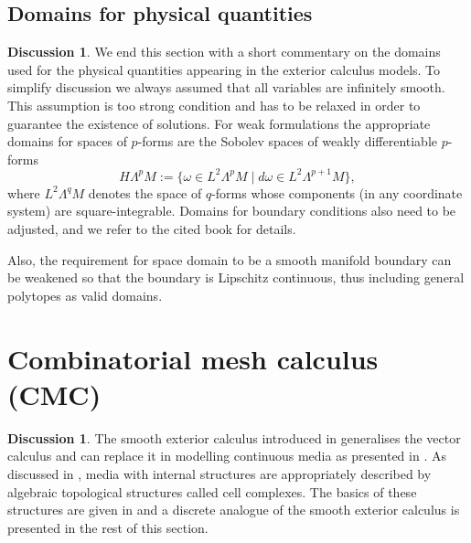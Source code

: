 \documentclass{elsarticle}
\theoremstyle{definition}
\newtheorem{discussion}[theorem]{Discussion}
\newcommand{\set}[2]{\{#1 \mid #2\}}
\begin{document}
\subsection{Domains for physical quantities}
\phantom{T}
\begin{discussion}
  We end this section with a short commentary on the domains used for the physical quantities appearing in the exterior calculus models.
  To simplify discussion we always assumed that all variables are infinitely smooth.
  This assumption is too strong condition and has to be relaxed in order to guarantee the existence of solutions.
  For weak formulations the appropriate domains for spaces of $p$-forms are the Sobolev spaces of weakly differentiable $p$-forms \cite{arnold2018finite}
  \begin{equation}
    H \Lambda^p M := \set{\omega \in L^2 \Lambda^p M}{d \omega \in L^2 \Lambda^{p + 1} M },
  \end{equation}
  where $L^2 \Lambda^q M$ denotes the space of $q$-forms whose components (in any coordinate system) are square-integrable.
  Domains for boundary conditions also need to be adjusted, and we refer to the cited book for details.

  Also, the requirement for space domain to be a smooth manifold boundary can be weakened so that the boundary is Lipschitz continuous, thus including general polytopes as valid domains.
\end{discussion}

\section{Combinatorial mesh calculus (CMC)}
\label{sec:combinatorial}
\begin{discussion}
  The smooth exterior calculus introduced in  generalises the vector calculus and can replace it in modelling continuous media as presented in .
  As discussed in , media with internal structures are appropriately described by algebraic topological structures called cell complexes.
  The basics of these structures are given in  and a discrete analogue of the smooth exterior calculus is presented in the rest of this section.
\end{discussion}
\end{document}
